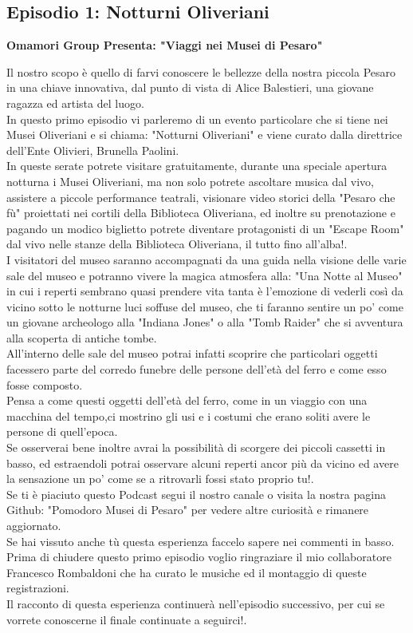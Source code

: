 \documentclass[hidelinks,12pt,a4paper]{article}
\begin{document}
\begin{flushleft}
		\subsection{Episodio 1: Notturni Oliveriani}
		\begin{center}
			\textbf{Omamori Group Presenta: "Viaggi nei Musei di Pesaro"}
		\end{center}
		Il nostro scopo è quello di farvi conoscere le bellezze della nostra piccola Pesaro in una chiave innovativa, dal punto di vista di Alice Balestieri, una giovane ragazza ed artista del luogo.\\
		In questo primo episodio vi parleremo di un evento particolare che si tiene nei Musei Oliveriani e si chiama: "Notturni Oliveriani" e viene curato dalla direttrice dell'Ente Olivieri, Brunella Paolini.\\
		In queste serate potrete visitare gratuitamente, durante una speciale apertura notturna i Musei Oliveriani, ma non solo potrete ascoltare musica dal vivo, assistere a piccole performance teatrali, visionare video storici della "Pesaro che fù" proiettati nei cortili della Biblioteca Oliveriana, ed inoltre su prenotazione e pagando un modico biglietto potrete diventare protagonisti di un "Escape Room" dal vivo nelle stanze della Biblioteca Oliveriana, il tutto fino all'alba!.\\
		I visitatori del museo saranno accompagnati da una guida nella visione delle varie sale del museo e potranno vivere la magica atmosfera alla: "Una Notte al Museo" in cui i reperti sembrano quasi prendere vita tanta è l'emozione di vederli così da vicino sotto le notturne luci soffuse del museo, che ti faranno sentire un po' come un giovane archeologo alla "Indiana Jones" o alla "Tomb Raider" che si avventura alla scoperta di antiche tombe.\\
		All'interno delle sale del museo potrai infatti scoprire che particolari oggetti facessero parte del corredo funebre delle persone dell'età del ferro e come esso fosse composto.\\
		Pensa a come questi oggetti dell'età del ferro, come in un viaggio con una macchina del tempo,ci mostrino gli usi e i costumi che erano soliti avere le persone di quell'epoca.\\
		Se osserverai bene inoltre avrai la possibilità di scorgere dei piccoli cassetti in basso, ed estraendoli potrai osservare alcuni  reperti ancor più da vicino ed avere la sensazione un po' come se a ritrovarli fossi stato proprio tu!.\\
		Se ti è piaciuto questo Podcast segui il nostro canale o visita la nostra pagina Github: "Pomodoro Musei di Pesaro" per vedere altre curiosità e rimanere aggiornato.\\
		Se hai vissuto anche tù questa esperienza faccelo sapere nei commenti in basso.\\
		Prima di chiudere questo primo episodio voglio ringraziare il mio collaboratore Francesco Rombaldoni che ha curato le musiche ed il montaggio di queste registrazioni.\\
		Il racconto di questa esperienza continuerà nell'episodio successivo, per cui se vorrete conoscerne il finale continuate a seguirci!.\\
		

\end{flushleft}
\end{document}
